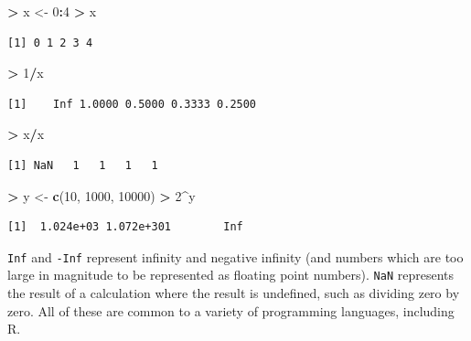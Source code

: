 \documentclass[]{krantz}
\makeatletter
\newenvironment{Shaded}{\begin{snugshade}}{\end{snugshade}}
\newcommand{\DecValTok}[1]{\textcolor[rgb]{0.06,0.06,0.06}{#1}}
\newcommand{\KeywordTok}[1]{\textcolor[rgb]{0.27,0.27,0.27}{\textbf{#1}}}
\newcommand{\NormalTok}[1]{#1}
\newcommand{\OperatorTok}[1]{\textcolor[rgb]{0.43,0.43,0.43}{\textbf{#1}}}
\newcommand{\StringTok}[1]{\textcolor[rgb]{0.5,0.5,0.5}{#1}}
\newenvironment{kframe}{%
\medskip{}
\setlength{\fboxsep}{.8em}
 \def\at@end@of@kframe{}%
 \ifinner\ifhmode%
  \def\at@end@of@kframe{\end{minipage}}%
  \begin{minipage}{\columnwidth}%
 \fi\fi%
 \def\FrameCommand##1{\hskip\@totalleftmargin \hskip-\fboxsep
 \colorbox{shadecolor}{##1}\hskip-\fboxsep
     \hskip-\linewidth \hskip-\@totalleftmargin \hskip\columnwidth}%
 \MakeFramed {\advance\hsize-\width
   \@totalleftmargin\z@ \linewidth\hsize
   \@setminipage}}%
 {\par\unskip\endMakeFramed%
 \at@end@of@kframe}
\renewenvironment{Shaded}{\begin{kframe}}{\end{kframe}}
\makeatother
\begin{document}
\begin{Shaded}
\begin{Highlighting}[]
\OperatorTok{>}\StringTok{ }\NormalTok{x <-}\StringTok{ }\DecValTok{0}\OperatorTok{:}\DecValTok{4}
\OperatorTok{>}\StringTok{ }\NormalTok{x}
\end{Highlighting}
\end{Shaded}

\begin{verbatim}
[1] 0 1 2 3 4
\end{verbatim}

\begin{Shaded}
\begin{Highlighting}[]
\OperatorTok{>}\StringTok{ }\DecValTok{1}\OperatorTok{/}\NormalTok{x}
\end{Highlighting}
\end{Shaded}

\begin{verbatim}
[1]    Inf 1.0000 0.5000 0.3333 0.2500
\end{verbatim}

\begin{Shaded}
\begin{Highlighting}[]
\OperatorTok{>}\StringTok{ }\NormalTok{x}\OperatorTok{/}\NormalTok{x}
\end{Highlighting}
\end{Shaded}

\begin{verbatim}
[1] NaN   1   1   1   1
\end{verbatim}

\begin{Shaded}
\begin{Highlighting}[]
\OperatorTok{>}\StringTok{ }\NormalTok{y <-}\StringTok{ }\KeywordTok{c}\NormalTok{(}\DecValTok{10}\NormalTok{, }\DecValTok{1000}\NormalTok{, }\DecValTok{10000}\NormalTok{)}
\OperatorTok{>}\StringTok{ }\DecValTok{2}\OperatorTok{^}\NormalTok{y}
\end{Highlighting}
\end{Shaded}

\begin{verbatim}
[1]  1.024e+03 1.072e+301        Inf
\end{verbatim}

\texttt{Inf} and \texttt{-Inf} represent infinity and negative infinity (and numbers which are too large in magnitude to be represented as floating point numbers). \texttt{NaN} represents the result of a calculation where the result is undefined, such as dividing zero by zero. All of these are common to a variety of programming languages, including R.
\end{document}

